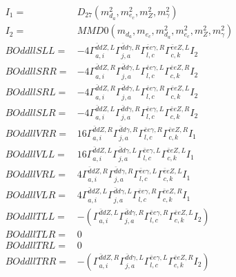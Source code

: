 \documentclass[A4,landscape]{article}
\begin{document}
\begin{align} 
I_1 = & D_{27}(m^2_{d_{{a}}}, m^2_{e_{{c}}}, m^2_{Z}, m^2_{\gamma}) \\ 
I_2 = & MMD0(m_{d_{{a}}}, m_{e_{{c}}}, m^2_{d_{{a}}}, m^2_{e_{{c}}}, m^2_{Z}, m^2_{\gamma}) \\ 
  BOddllSLL= & -4  \Gamma^{\bar{d}d Z ,L}_{a, i} \Gamma^{\bar{d}d \gamma ,R}_{j, a} \Gamma^{\bar{e}e \gamma ,R}_{l, c} \Gamma^{\bar{e}e Z ,L}_{c, k} I_2 \\ 
  BOddllSRR= & -4  \Gamma^{\bar{d}d Z ,R}_{a, i} \Gamma^{\bar{d}d \gamma ,L}_{j, a} \Gamma^{\bar{e}e \gamma ,L}_{l, c} \Gamma^{\bar{e}e Z ,R}_{c, k} I_2 \\ 
  BOddllSRL= & -4  \Gamma^{\bar{d}d Z ,R}_{a, i} \Gamma^{\bar{d}d \gamma ,L}_{j, a} \Gamma^{\bar{e}e \gamma ,R}_{l, c} \Gamma^{\bar{e}e Z ,L}_{c, k} I_2 \\ 
  BOddllSLR= & -4  \Gamma^{\bar{d}d Z ,L}_{a, i} \Gamma^{\bar{d}d \gamma ,R}_{j, a} \Gamma^{\bar{e}e \gamma ,L}_{l, c} \Gamma^{\bar{e}e Z ,R}_{c, k} I_2 \\ 
  BOddllVRR= & 16  \Gamma^{\bar{d}d Z ,R}_{a, i} \Gamma^{\bar{d}d \gamma ,R}_{j, a} \Gamma^{\bar{e}e \gamma ,R}_{l, c} \Gamma^{\bar{e}e Z ,R}_{c, k} I_1 \\ 
  BOddllVLL= & 16  \Gamma^{\bar{d}d Z ,L}_{a, i} \Gamma^{\bar{d}d \gamma ,L}_{j, a} \Gamma^{\bar{e}e \gamma ,L}_{l, c} \Gamma^{\bar{e}e Z ,L}_{c, k} I_1 \\ 
  BOddllVRL= & 4  \Gamma^{\bar{d}d Z ,R}_{a, i} \Gamma^{\bar{d}d \gamma ,R}_{j, a} \Gamma^{\bar{e}e \gamma ,L}_{l, c} \Gamma^{\bar{e}e Z ,L}_{c, k} I_1 \\ 
  BOddllVLR= & 4  \Gamma^{\bar{d}d Z ,L}_{a, i} \Gamma^{\bar{d}d \gamma ,L}_{j, a} \Gamma^{\bar{e}e \gamma ,R}_{l, c} \Gamma^{\bar{e}e Z ,R}_{c, k} I_1 \\ 
  BOddllTLL= & -( \Gamma^{\bar{d}d Z ,L}_{a, i} \Gamma^{\bar{d}d \gamma ,R}_{j, a} \Gamma^{\bar{e}e \gamma ,R}_{l, c} \Gamma^{\bar{e}e Z ,L}_{c, k} I_2) \\ 
  BOddllTLR= & 0 \\ 
  BOddllTRL= & 0 \\ 
  BOddllTRR= & -( \Gamma^{\bar{d}d Z ,R}_{a, i} \Gamma^{\bar{d}d \gamma ,L}_{j, a} \Gamma^{\bar{e}e \gamma ,L}_{l, c} \Gamma^{\bar{e}e Z ,R}_{c, k} I_2) \\ 
\end{align} 
\end{document}
